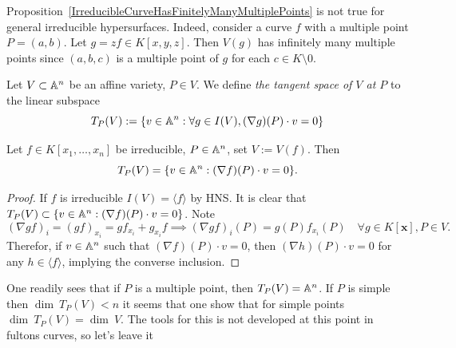         \begin{example}
            Proposition~\ref{IrreducibleCurveHasFinitelyManyMultiplePoints} is not true for general irreducible hypersurfaces. Indeed, consider a curve $f$ with a multiple point $P=(a,b)$. Let $g = zf\in K[x,y,z]$. Then $V(g)$ has infinitely many multiple points since $(a,b,c)$ is a multiple point of $g$ for each $c\in K\setminus 0$. 
        \end{example}
        \begin{definition}
            Let $V\subset \mathbb{A}^n$ be an affine variety, $P\in V$. We define \textit{the tangent space of $V$ at $P$} to the linear subspace
            $$T_P(V):=\left\{v\in \mathbb{A}^n : \forall g\in I(V), (\nabla g)(P)\cdot v=0\right\}$$
        \end{definition}
        \begin{lemma}
            Let $f\in K[x_1,\dots,x_n]$ be irreducible, $P\in \mathbb{A}^n$, set $V:=V(f)$. Then 
            $$T_P(V)=\{v\in \mathbb{A}^n : (\nabla f)(P)\cdot v=0\}.$$
        \end{lemma}
        \begin{proof}
            If $f$ is irreducible $I(V)=\langle f\rangle$ by HNS. It is clear that $T_P(V)\subset \{v\in \mathbb{A}^n : (\nabla f)(P)\cdot v=0\}$. Note 
            $$(\nabla gf)_i = (gf)_{x_i} = gf_{x_i} +g_{x_i}f\implies (\nabla gf)_i(P) = g(P) f_{x_i}(P)\quad  \forall g\in K[\mathbf{x}], P \in V. $$
            Therefor, if $v\in \mathbb{A}^n$ such that $(\nabla f)(P)\cdot v =0$, then $(\nabla h)(P)\cdot v = 0$ for any $h\in \langle f\rangle$, implying the converse inclusion. 
        \end{proof}
        \begin{remark}
            One readily sees that if $P$ is a multiple point, then $T_P(V)=\mathbb{A}^n$. If $P$ is simple then $\dim \ T_P(V)< n$ {\Large it seems that one show that for simple points $\dim \ T_P(V) = \dim \ V$. The tools for this is not developed at this point in fultons curves, so let's leave it}
        \end{remark}
